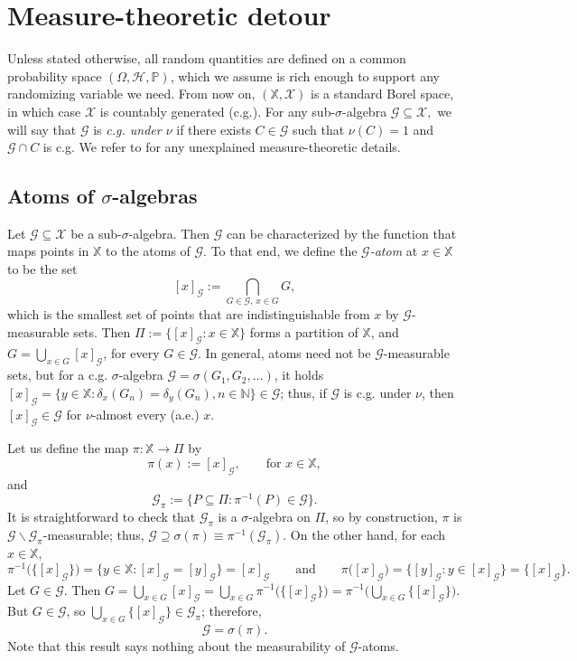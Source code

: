 \documentclass[a4paper]{article}
\theoremstyle{plain}
\theoremstyle{remark}
\theoremstyle{definition}
\begin{document}
\section{Measure-theoretic detour}\label{section:kernel}

Unless stated otherwise, all random quantities are defined on a common probability space $(\Omega,\mathcal{H},\mathbb{P})$, which we assume is rich enough to support any randomizing variable we need. From now on, $(\mathbb{X},\mathcal{X})$ is a standard Borel space, in which case $\mathcal{X}$ is countably generated (c.g.). For any sub-$\sigma$-algebra $\mathcal{G}\subseteq\mathcal{X},$  we will say that $\mathcal{G}$ is \textit{c.g. under $\nu$} if there exists $C\in\mathcal{G}$ such that $\nu(C)=1$ and $\mathcal{G}\cap C$ is c.g. We refer to \cite{kallenberg2021} for any unexplained measure-theoretic details.

\subsection{Atoms of $\sigma$-algebras}\label{section:model:atoms}

Let $\mathcal{G}\subseteq\mathcal{X}$ be a sub-$\sigma$-algebra. Then $\mathcal{G}$ can be characterized by the function that maps points in $\mathbb{X}$ to the atoms of $\mathcal{G}$. To that end, we define the \textit{$\mathcal{G}$-atom} at $x\in\mathbb{X}$ to be the set
\[[x]_\mathcal{G}:=\bigcap_{G\in\mathcal{G},\,x\in G}G,\]
which is the smallest set of points that are indistinguishable from $x$ by $\mathcal{G}$-measurable sets. Then $\Pi:=\{[x]_\mathcal{G}:x\in\mathbb{X}\}$ forms a partition of $\mathbb{X}$, and $G=\bigcup_{x\in G}[x]_\mathcal{G}$, for every $G\in\mathcal{G}$. In general, atoms need not be $\mathcal{G}$-measurable sets, but for a c.g. $\sigma$-algebra $\mathcal{G}=\sigma(G_1,G_2,\ldots)$, it holds $[x]_\mathcal{G}=\{y\in\mathbb{X}:\delta_x(G_n)=\delta_y(G_n),n\in\mathbb{N}\}\in\mathcal{G}$; thus, if $\mathcal{G}$ is c.g. under $\nu$, then $[x]_\mathcal{G}\in\mathcal{G}$ for $\nu$-almost every (a.e.) $x$.

Let us define the map $\pi:\mathbb{X}\rightarrow\Pi$ by
\[\pi(x):=[x]_\mathcal{G},\qquad\mbox{for }x\in\mathbb{X},\]
and
\[\mathcal{G}_\pi:=\{P\subseteq\Pi:\pi^{-1}(P)\in\mathcal{G}\}.\]
It is straightforward to check that $\mathcal{G}_\pi$ is a $\sigma$-algebra on $\Pi$, so by construction, $\pi$ is $\mathcal{G}\backslash\mathcal{G}_\pi$-measurable; thus, $\mathcal{G}\supseteq\sigma(\pi)\equiv\pi^{-1}(\mathcal{G}_\pi)$. On the other hand, for each $x\in\mathbb{X}$,
\[\pi^{-1}\bigl(\bigl\{[x]_\mathcal{G}\bigr\}\bigr)=\{y\in\mathbb{X}:[x]_\mathcal{G}=[y]_\mathcal{G}\}=[x]_\mathcal{G}\qquad\mbox{and}\qquad \pi\bigl([x]_\mathcal{G}\bigr)=\bigl\{[y]_\mathcal{G}:y\in[x]_\mathcal{G}\bigr\}=\bigl\{[x]_\mathcal{G}\bigr\}.\]
Let $G\in\mathcal{G}$. Then $G=\bigcup_{x\in G}[x]_\mathcal{G}=\bigcup_{x\in G}\pi^{-1}\bigl(\bigl\{[x]_\mathcal{G}\bigr\}\bigr)=\pi^{-1}\bigl(\bigcup_{x\in G}\bigl\{[x]_\mathcal{G}\bigr\}\bigr)$. But $G\in\mathcal{G}$, so $\bigcup_{x\in G}\bigl\{[x]_\mathcal{G}\bigr\}\in\mathcal{G}_\pi$; therefore,
\[\mathcal{G}=\sigma(\pi).\]
Note that this result says nothing about the measurability of $\mathcal{G}$-atoms.
\end{document}
